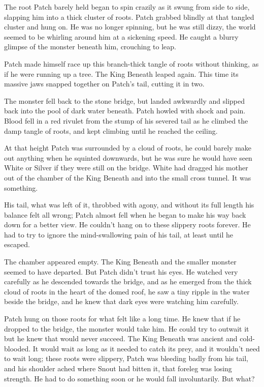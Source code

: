 \documentclass[12pt]{book}
\begin{document}
The root Patch barely held began to spin crazily as it swung from side to side, slapping him into a thick cluster of roots. Patch grabbed blindly at that tangled cluster and hung on. He was no longer spinning, but he was still dizzy, the world seemed to be whirling around him at a sickening speed. He caught a blurry glimpse of the monster beneath him, crouching to leap.

Patch made himself race up this branch-thick tangle of roots without thinking, as if he were running up a tree. The King Beneath leaped again. This time its massive jaws snapped together on Patch's tail, cutting it in two.

The monster fell back to the stone bridge, but landed awkwardly and slipped back into the pool of dark water beneath. Patch howled with shock and pain. Blood fell in a red rivulet from the stump of his severed tail as he climbed the damp tangle of roots, and kept climbing until he reached the ceiling.

At that height Patch was surrounded by a cloud of roots, he could barely make out anything when he squinted downwards, but he was sure he would have seen White or Silver if they were still on the bridge. White had dragged his mother out of the chamber of the King Beneath and into the small cross tunnel. It was something. 

His tail, what was left of it, throbbed with agony, and without its full length his balance felt all wrong; Patch almost fell when he began to make his way back down for a better view. He couldn't hang on to these slippery roots forever. He had to try to ignore the mind-swallowing pain of his tail, at least until he escaped.

The chamber appeared empty. The King Beneath and the smaller monster seemed to have departed. But Patch didn't trust his eyes. He watched very carefully as he descended towards the bridge, and as he emerged from the thick cloud of roots in the heart of the domed roof, he saw a tiny ripple in the water beside the bridge, and he knew that dark eyes were watching him carefully.

Patch hung on those roots for what felt like a long time. He knew that if he dropped to the bridge, the monster would take him. He could try to outwait it %
but he knew that would never succeed. The King Beneath was ancient and cold-blooded. It would wait as long as it needed to catch its prey, and it wouldn't need to wait long; these roots were slippery, Patch was bleeding badly from his tail, and his shoulder ached where Snout had bitten it, that foreleg was losing strength. He had to do something soon or he would fall involuntarily. But what?
\end{document}
